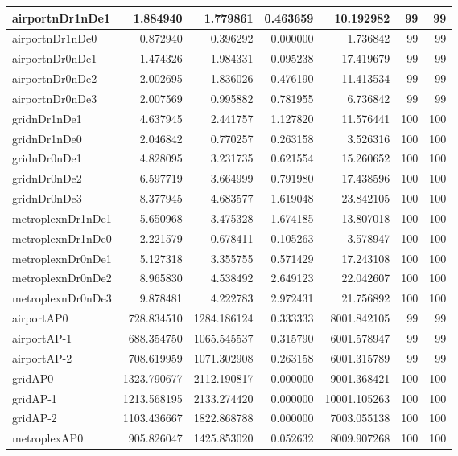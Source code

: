 \begin{longtable}{|l|r|r|r|r|r|r|}
\endlastfoot
airportnDr1nDe1 & 1.884940 & 1.779861 & 0.463659 & 10.192982 & 99 & 99 \\ \hline
airportnDr1nDe0 & 0.872940 & 0.396292 & 0.000000 & 1.736842 & 99 & 99 \\ \hline
airportnDr0nDe1 & 1.474326 & 1.984331 & 0.095238 & 17.419679 & 99 & 99 \\ \hline
airportnDr0nDe2 & 2.002695 & 1.836026 & 0.476190 & 11.413534 & 99 & 99 \\ \hline
airportnDr0nDe3 & 2.007569 & 0.995882 & 0.781955 & 6.736842 & 99 & 99 \\ \hline
gridnDr1nDe1 & 4.637945 & 2.441757 & 1.127820 & 11.576441 & 100 & 100 \\ \hline
gridnDr1nDe0 & 2.046842 & 0.770257 & 0.263158 & 3.526316 & 100 & 100 \\ \hline
gridnDr0nDe1 & 4.828095 & 3.231735 & 0.621554 & 15.260652 & 100 & 100 \\ \hline
gridnDr0nDe2 & 6.597719 & 3.664999 & 0.791980 & 17.438596 & 100 & 100 \\ \hline
gridnDr0nDe3 & 8.377945 & 4.683577 & 1.619048 & 23.842105 & 100 & 100 \\ \hline
metroplexnDr1nDe1 & 5.650968 & 3.475328 & 1.674185 & 13.807018 & 100 & 100 \\ \hline
metroplexnDr1nDe0 & 2.221579 & 0.678411 & 0.105263 & 3.578947 & 100 & 100 \\ \hline
metroplexnDr0nDe1 & 5.127318 & 3.355755 & 0.571429 & 17.243108 & 100 & 100 \\ \hline
metroplexnDr0nDe2 & 8.965830 & 4.538492 & 2.649123 & 22.042607 & 100 & 100 \\ \hline
metroplexnDr0nDe3 & 9.878481 & 4.222783 & 2.972431 & 21.756892 & 100 & 100 \\ \hline
airportAP0 & 728.834510 & 1284.186124 & 0.333333 & 8001.842105 & 99 & 99 \\ \hline
airportAP-1 & 688.354750 & 1065.545537 & 0.315790 & 6001.578947 & 99 & 99 \\ \hline
airportAP-2 & 708.619959 & 1071.302908 & 0.263158 & 6001.315789 & 99 & 99 \\ \hline
gridAP0 & 1323.790677 & 2112.190817 & 0.000000 & 9001.368421 & 100 & 100 \\ \hline
gridAP-1 & 1213.568195 & 2133.274420 & 0.000000 & 10001.105263 & 100 & 100 \\ \hline
gridAP-2 & 1103.436667 & 1822.868788 & 0.000000 & 7003.055138 & 100 & 100 \\ \hline
metroplexAP0 & 905.826047 & 1425.853020 & 0.052632 & 8009.907268 & 100 & 100 \\ \hline

\end{longtable}
